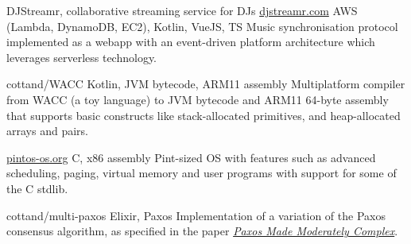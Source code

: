 \begin{entrylist}
    \projEntry
    {DJStreamr, collaborative streaming service for DJs}
    {\href{https://djstreamr.com}{djstreamr.com}}
    {AWS (Lambda, DynamoDB, EC2), Kotlin, VueJS, TS}
    {
        Music synchronisation protocol implemented as a webapp with an event-driven platform
        architecture which leverages serverless technology.
    }

    {cottand/WACC}
    {Kotlin, JVM bytecode, ARM11 assembly}
    {
        Multiplatform compiler from WACC (a toy language) to JVM bytecode and ARM11 64-byte assembly
    that supports basic constructs like stack-allocated primitives, and heap-allocated arrays
    and pairs.
    }

    {\href{https://pintos-os.org/}{pintos-os.org}}
    {C, x86 assembly}
    {
        Pint-sized OS with features such as advanced scheduling, paging, virtual memory and user
    programs with support for some of the C stdlib.
    }




    {cottand/multi-paxos}
    {Elixir, Paxos}
    {
        Implementation of a variation of the Paxos consensus algorithm, as specified in the paper
    \href{https://dl.acm.org/citation.cfm?id=2673577}{\textit{Paxos Made Moderately Complex}}.
    }
\end{entrylist}

